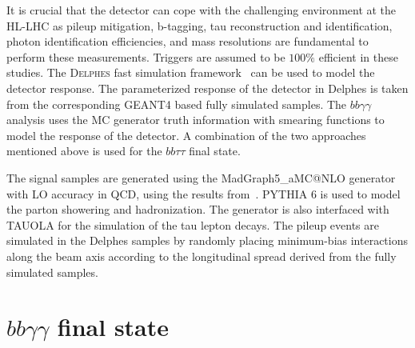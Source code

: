 It is crucial that the \phasetwo detector can cope with the challenging environment at the HL-LHC as pileup mitigation, b-tagging, tau reconstruction and identification, photon identification efficiencies, and mass  resolutions are fundamental to perform these measurements. Triggers are assumed to be $100\%$ efficient in these studies. The \textsc{Delphes} fast simulation framework~\cite{deFavereau:2013fsa} can be used to model the \phasetwo detector response. The parameterized response of the \phasetwo detector in Delphes is taken from the corresponding GEANT4 based fully simulated samples. The $bb\gamma\gamma$ analysis uses the MC generator truth information with smearing functions to model the response of the detector. A combination of the two approaches mentioned above is used for the $bb\tau\tau$ final state.  

The signal samples are generated using the MadGraph5\_aMC@NLO generator with LO accuracy in QCD, using the results from~\cite{Frederix2014142}. PYTHIA 6 is used to model the parton showering and hadronization. The generator is also interfaced with TAUOLA for the simulation of the tau lepton decays. The pileup events are simulated in the Delphes samples by randomly placing minimum-bias interactions along the beam axis according to the longitudinal spread derived from the fully simulated samples.

\section{$bb\gamma\gamma$ final state}

